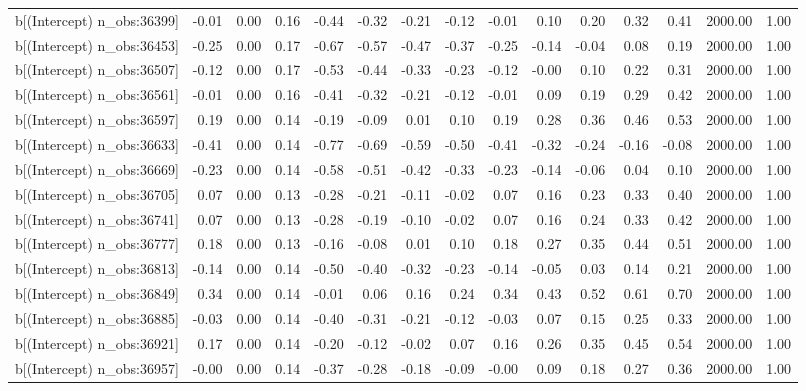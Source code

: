 \begin{table}[ht]
\begin{tabular}{rrrrrrrrrrrrrrr}
  b[(Intercept) n\_obs:36399] & -0.01 & 0.00 & 0.16 & -0.44 & -0.32 & -0.21 & -0.12 & -0.01 & 0.10 & 0.20 & 0.32 & 0.41 & 2000.00 & 1.00 \\ 
  b[(Intercept) n\_obs:36453] & -0.25 & 0.00 & 0.17 & -0.67 & -0.57 & -0.47 & -0.37 & -0.25 & -0.14 & -0.04 & 0.08 & 0.19 & 2000.00 & 1.00 \\ 
  b[(Intercept) n\_obs:36507] & -0.12 & 0.00 & 0.17 & -0.53 & -0.44 & -0.33 & -0.23 & -0.12 & -0.00 & 0.10 & 0.22 & 0.31 & 2000.00 & 1.00 \\ 
  b[(Intercept) n\_obs:36561] & -0.01 & 0.00 & 0.16 & -0.41 & -0.32 & -0.21 & -0.12 & -0.01 & 0.09 & 0.19 & 0.29 & 0.42 & 2000.00 & 1.00 \\ 
  b[(Intercept) n\_obs:36597] & 0.19 & 0.00 & 0.14 & -0.19 & -0.09 & 0.01 & 0.10 & 0.19 & 0.28 & 0.36 & 0.46 & 0.53 & 2000.00 & 1.00 \\ 
  b[(Intercept) n\_obs:36633] & -0.41 & 0.00 & 0.14 & -0.77 & -0.69 & -0.59 & -0.50 & -0.41 & -0.32 & -0.24 & -0.16 & -0.08 & 2000.00 & 1.00 \\ 
  b[(Intercept) n\_obs:36669] & -0.23 & 0.00 & 0.14 & -0.58 & -0.51 & -0.42 & -0.33 & -0.23 & -0.14 & -0.06 & 0.04 & 0.10 & 2000.00 & 1.00 \\ 
  b[(Intercept) n\_obs:36705] & 0.07 & 0.00 & 0.13 & -0.28 & -0.21 & -0.11 & -0.02 & 0.07 & 0.16 & 0.23 & 0.33 & 0.40 & 2000.00 & 1.00 \\ 
  b[(Intercept) n\_obs:36741] & 0.07 & 0.00 & 0.13 & -0.28 & -0.19 & -0.10 & -0.02 & 0.07 & 0.16 & 0.24 & 0.33 & 0.42 & 2000.00 & 1.00 \\ 
  b[(Intercept) n\_obs:36777] & 0.18 & 0.00 & 0.13 & -0.16 & -0.08 & 0.01 & 0.10 & 0.18 & 0.27 & 0.35 & 0.44 & 0.51 & 2000.00 & 1.00 \\ 
  b[(Intercept) n\_obs:36813] & -0.14 & 0.00 & 0.14 & -0.50 & -0.40 & -0.32 & -0.23 & -0.14 & -0.05 & 0.03 & 0.14 & 0.21 & 2000.00 & 1.00 \\ 
  b[(Intercept) n\_obs:36849] & 0.34 & 0.00 & 0.14 & -0.01 & 0.06 & 0.16 & 0.24 & 0.34 & 0.43 & 0.52 & 0.61 & 0.70 & 2000.00 & 1.00 \\ 
  b[(Intercept) n\_obs:36885] & -0.03 & 0.00 & 0.14 & -0.40 & -0.31 & -0.21 & -0.12 & -0.03 & 0.07 & 0.15 & 0.25 & 0.33 & 2000.00 & 1.00 \\ 
  b[(Intercept) n\_obs:36921] & 0.17 & 0.00 & 0.14 & -0.20 & -0.12 & -0.02 & 0.07 & 0.16 & 0.26 & 0.35 & 0.45 & 0.54 & 2000.00 & 1.00 \\ 
  b[(Intercept) n\_obs:36957] & -0.00 & 0.00 & 0.14 & -0.37 & -0.28 & -0.18 & -0.09 & -0.00 & 0.09 & 0.18 & 0.27 & 0.36 & 2000.00 & 1.00 \\ 

\end{tabular}
\end{table}

